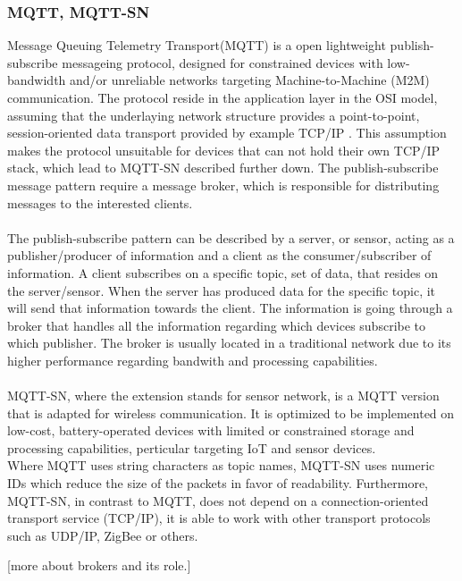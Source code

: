 \subsubsection{MQTT, MQTT-SN}
Message Queuing Telemetry Transport(MQTT) is a open lightweight publish-subscribe messageing protocol, designed for constrained devices with low-bandwidth and/or unreliable networks targeting Machine-to-Machine (M2M) communication\cite{mqtt}. The protocol reside in the application layer in the OSI model, assuming that the underlaying network structure provides a point-to-point, session-oriented data transport provided by example TCP/IP \cite{hunkeler2008mqtt}. This assumption makes the protocol unsuitable for devices that can not hold their own TCP/IP stack, which lead to MQTT-SN described further down. The publish-subscribe message pattern require a message broker, which is responsible for distributing messages to the interested clients.
\\\\
The publish-subscribe pattern can be described by a server, or sensor, acting as a publisher/producer of information and a client as the consumer/subscriber of information. A client subscribes on a specific topic, set of data, that resides on the server/sensor. When the server has produced data for the specific topic, it will send that information towards the client. 
The information is going through a broker that handles all the information regarding which devices subscribe to which publisher. The broker is usually located in a traditional network due to its higher performance regarding bandwith and processing capabilities.\\\\
MQTT-SN, where the extension stands for sensor network, is a MQTT version that is adapted for wireless communication. It is optimized to be implemented on low-cost, battery-operated devices with limited or constrained storage and processing capabilities\cite{MQTT-SN}, perticular targeting IoT and sensor devices.\\
Where MQTT uses string characters as topic names, MQTT-SN uses numeric IDs which reduce the size of the packets in favor of readability. Furthermore, MQTT-SN, in contrast to MQTT, does not depend on a connection-oriented transport service (TCP/IP), it is able to work with other transport protocols such as UDP/IP, ZigBee or others. 

[more about brokers and its role.]

